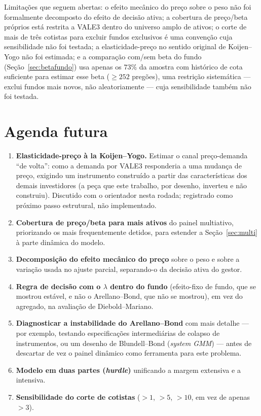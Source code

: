 \documentclass[12pt,a4paper]{article}
\begin{document}
Limitações que seguem abertas: o efeito mecânico do preço sobre o peso não foi formalmente
decomposto do efeito de decisão ativa; a cobertura de preço/beta próprios está restrita a VALE3
dentro do universo amplo de ativos; o corte de mais de três cotistas para excluir fundos
exclusivos é uma convenção cuja sensibilidade não foi testada; a elasticidade-preço no sentido
original de Koijen--Yogo não foi estimada; e a comparação com/sem beta do fundo
(Seção~\ref{sec:betafundo}) usa apenas os $73\%$ da amostra com histórico de cota suficiente para
estimar esse beta ($\geq252$ pregões), uma restrição sistemática --- exclui fundos mais novos, não
aleatoriamente --- cuja sensibilidade também não foi testada.

\section{Agenda futura}
\label{sec:agenda}

\begin{enumerate}[topsep=2pt,itemsep=2pt]
\item \textbf{Elasticidade-preço à la Koijen--Yogo.} Estimar o canal preço-demanda ``de volta'':
como a demanda por VALE3 responderia a uma mudança de preço, exigindo um instrumento construído a
partir das características dos demais investidores (a peça que este trabalho, por desenho,
inverteu e não construiu). Discutido com o orientador nesta rodada; registrado como próximo passo
estrutural, não implementado.
\item \textbf{Cobertura de preço/beta para mais ativos} do painel multiativo, priorizando os mais
frequentemente detidos, para estender a Seção~\ref{sec:multi} à parte dinâmica do modelo.
\item \textbf{Decomposição do efeito mecânico do preço} sobre o peso e sobre a variação usada no
ajuste parcial, separando-o da decisão ativa do gestor.
\item \textbf{Regra de decisão com o $\lambda$ dentro do fundo} (efeito-fixo de fundo, que se
mostrou estável, e não o Arellano--Bond, que não se mostrou), em vez do agregado, na avaliação de
Diebold--Mariano.
\item \textbf{Diagnosticar a instabilidade do Arellano--Bond} com mais detalhe --- por exemplo,
testando especificações intermediárias de colapso de instrumentos, ou um desenho de
Blundell--Bond (\emph{system GMM}) --- antes de descartar de vez o painel dinâmico como
ferramenta para este problema.
\item \textbf{Modelo em duas partes (\emph{hurdle})} unificando a margem extensiva e a intensiva.
\item \textbf{Sensibilidade do corte de cotistas} ($>1$, $>5$, $>10$, em vez de apenas $>3$).
\end{enumerate}
\end{document}
